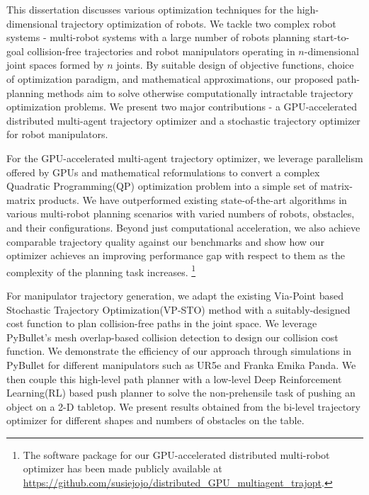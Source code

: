 This dissertation discusses various optimization techniques for the high-dimensional trajectory optimization of robots. We tackle two complex robot systems - multi-robot systems with a large number of robots planning start-to-goal collision-free trajectories and robot manipulators operating in $n$-dimensional joint spaces formed by $n$ joints. By suitable design of objective functions, choice of optimization paradigm, and mathematical approximations, our proposed path-planning methods aim to solve otherwise computationally intractable trajectory optimization problems. We present two major contributions - a GPU-accelerated distributed multi-agent trajectory optimizer and a stochastic trajectory optimizer for robot manipulators. 

For the GPU-accelerated multi-agent trajectory optimizer, we leverage parallelism offered by GPUs and mathematical reformulations to convert a complex Quadratic Programming(QP) optimization problem into a simple set of matrix-matrix products. We have outperformed existing state-of-the-art algorithms in various multi-robot planning scenarios with varied numbers of robots, obstacles, and their configurations. Beyond just computational acceleration, we also achieve comparable trajectory quality against our benchmarks and show how our optimizer achieves an improving performance gap with respect to them as the complexity of the planning task increases. 
\footnote{The software package for our GPU-accelerated distributed multi-robot optimizer has been made publicly available at \url{https://github.com/susiejojo/distributed_GPU_multiagent_trajopt}.}

For manipulator trajectory generation, we adapt the existing Via-Point based Stochastic Trajectory Optimization(VP-STO) method with a suitably-designed cost function to plan collision-free paths in the joint space. We leverage PyBullet's mesh overlap-based collision detection to design our collision cost function. We demonstrate the efficiency of our approach through simulations in PyBullet for different manipulators such as UR5e and Franka Emika Panda. We then couple this high-level path planner with a low-level Deep Reinforcement Learning(RL) based push planner to solve the non-prehensile task of pushing an object on a 2-D tabletop. We present results obtained from the bi-level trajectory optimizer for different shapes and numbers of obstacles on the table. 

